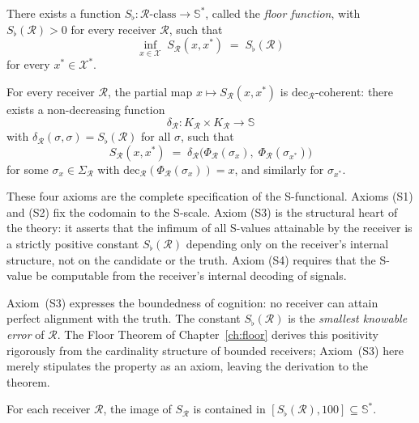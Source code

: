 \begin{theorem}\label{ax:S3-mono}
There exists a function $S_{\flat} : \mathcal{R}\text{-class} \to \mathbb{S}^{*}$,
called the \emph{floor function}, with $S_{\flat}(\mathcal{R}) > 0$ for every
receiver $\mathcal{R}$, such that
\[
  \inf_{x \in \mathcal{X}}\; S_{\mathcal{R}}(x, x^{*})
  \;=\; S_{\flat}(\mathcal{R})
\]
for every $x^{*} \in \mathcal{X}^{*}$.
\end{theorem}

\begin{theorem}\label{ax:S4-mono}
For every receiver $\mathcal{R}$, the partial map
$x \mapsto S_{\mathcal{R}}(x, x^{*})$ is
$\mathrm{dec}_{\mathcal{R}}$-coherent: there exists a non-decreasing function
\[
  \delta_{\mathcal{R}} :
  K_{\mathcal{R}} \times K_{\mathcal{R}} \to \mathbb{S}
\]
with $\delta_{\mathcal{R}}(\sigma, \sigma) = S_{\flat}(\mathcal{R})$ for all
$\sigma$, such that
\[
  S_{\mathcal{R}}(x, x^{*})
  \;=\; \delta_{\mathcal{R}}\!\bigl(
    \Phi_{\mathcal{R}}(\sigma_x),\;
    \Phi_{\mathcal{R}}(\sigma_{x^{*}})\bigr)
\]
for some $\sigma_x \in \Sigma_{\mathcal{R}}$ with
$\mathrm{dec}_{\mathcal{R}}(\Phi_{\mathcal{R}}(\sigma_x)) = x$,
and similarly for $\sigma_{x^{*}}$.
\end{theorem}

These four axioms are the complete specification of the S-functional.  Axioms
(S1) and (S2) fix the codomain to the S-scale.  Axiom (S3) is the structural
heart of the theory: it asserts that the infimum of all S-values attainable
by the receiver is a strictly positive constant $S_{\flat}(\mathcal{R})$
depending only on the receiver's internal structure, not on the candidate or
the truth.  Axiom (S4) requires that the S-value be computable from the
receiver's internal decoding of signals.

\begin{remark}
Axiom~(S3) expresses the boundedness of cognition: no receiver can attain
perfect alignment with the truth.  The constant $S_{\flat}(\mathcal{R})$ is
the \emph{smallest knowable error} of $\mathcal{R}$.  The Floor Theorem of
Chapter~\ref{ch:floor} derives this positivity rigorously from the cardinality
structure of bounded receivers; Axiom~(S3) here merely stipulates the property
as an axiom, leaving the derivation to the theorem.
\end{remark}

\begin{lemma}\label{lem:image-S-mono}
For each receiver $\mathcal{R}$, the image of $S_{\mathcal{R}}$ is contained
in $[S_{\flat}(\mathcal{R}), 100] \subseteq \mathbb{S}^{*}$.
\end{lemma}

